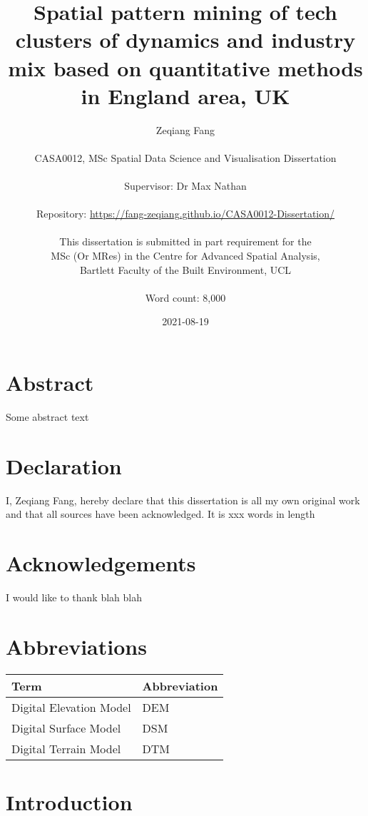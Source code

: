 \documentclass[
  12pt,
  oneside]{book}
\title{Spatial pattern mining of tech clusters of dynamics and industry mix based on quantitative methods in England area, UK}
\author{Zeqiang Fang\\
~\\
CASA0012, MSc Spatial Data Science and Visualisation Dissertation\\
~\\
Supervisor: Dr Max Nathan\\
~\\
Repository: \url{https://fang-zeqiang.github.io/CASA0012-Dissertation/}\\
~\\
This dissertation is submitted in part requirement for the\\
MSc (Or MRes) in the Centre for Advanced Spatial Analysis,\\
Bartlett Faculty of the Built Environment, UCL\\
~\\
Word count: 8,000}
\date{2021-08-19}
\begin{document}
\maketitle


\hypertarget{abstract}{%
\chapter*{Abstract}\label{abstract}}

Some abstract text


\hypertarget{declaration}{%
\chapter*{Declaration}\label{declaration}}

I, Zeqiang Fang, hereby declare that this dissertation is all my own original work and that all sources have been acknowledged. It is xxx words in length

\hypertarget{acknowledgements}{%
\chapter*{Acknowledgements}\label{acknowledgements}}

I would like to thank blah blah

\setcounter{tocdepth}{3}
\tableofcontents
\listoffigures
\listoftables

\hypertarget{abbreviations}{%
\chapter*{Abbreviations}\label{abbreviations}}

\begin{table}
\centering
\begin{tabular}{ll}
\toprule
\textbf{Term} & \textbf{Abbreviation}\\
\midrule
Digital Elevation Model & DEM\\
Digital Surface Model & DSM\\
Digital Terrain Model & DTM\\
\bottomrule
\end{tabular}
\end{table}

\hypertarget{introduction}{%
\chapter{Introduction}\label{introduction}}
\end{document}

